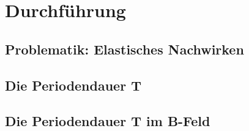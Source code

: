 \newpage
\section{Durchführung}
\subsection{Problematik: Elastisches Nachwirken}
\subsection{Die Periodendauer T}
\subsection{Die Periodendauer T im B-Feld}
\label{sec:Durchführung}
